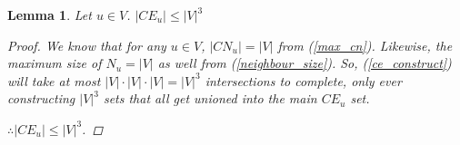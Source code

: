 \documentclass{article}
\theoremstyle{plain}
\newtheorem{lem}[thm]{Lemma}
\theoremstyle{definition}
\theoremstyle{remark}
\newcommand{\cn}[1]{ {{CN}_{#1}} }
\newcommand{\ce}[1]{ {{CE}_{#1}} }
\newcommand{\nev}[1]{ {N_{#1}} }
\begin{document}
\begin{lem}
    Let \(u \in V\). \(|\ce{u}| \leq |V|^3 \)
    \begin{proof}
        We know that for any \(u \in V\), \(|\cn{u}| = |V|\) from (\ref{max_cn}). Likewise,
        the maximum size of \(\nev{u} = |V|\) as well from (\ref{neighbour_size}). So,
        (\ref{ce_construct}) will take at most \(|V| \cdot |V| \cdot |V| = |V|^3\)
        intersections to complete, only ever constructing \(|V|^3\) sets that all get
        unioned into the main \(\ce{u}\) set.

        \(\therefore |\ce{u}| \leq |V|^3\).
    \end{proof}
    \label{max_ce}
\end{lem}

\end{document}
